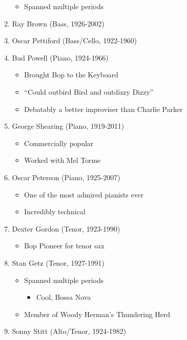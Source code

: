 \documentclass[]{article}
\providecommand{\tightlist}{%
  \setlength{\itemsep}{0pt}\setlength{\parskip}{0pt}}
\begin{document}
\begin{enumerate}
  \begin{itemize}
  \tightlist
  \item
    Spanned multiple periods
  \end{itemize}
\item
  Ray Brown (Bass, 1926-2002)
\item
  Oscar Pettiford (Bass/Cello, 1922-1960)
\item
  Bud Powell (Piano, 1924-1966)

  \begin{itemize}
  \tightlist
  \item
    Brought Bop to the Keyboard
  \item
    ``Could outbird Bird and outdizzy Dizzy''
  \item
    Debatably a better improviser than Charlie Parker
  \end{itemize}
\item
  George Shearing (Piano, 1919-2011)

  \begin{itemize}
  \tightlist
  \item
    Commercially popular
  \item
    Worked with Mel Torme
  \end{itemize}
\item
  Oscar Peterson (Piano, 1925-2007)

  \begin{itemize}
  \tightlist
  \item
    One of the most admired pianists ever
  \item
    Incredibly technical
  \end{itemize}
\item
  Dexter Gordon (Tenor, 1923-1990)

  \begin{itemize}
  \tightlist
  \item
    Bop Pioneer for tenor sax
  \end{itemize}
\item
  Stan Getz (Tenor, 1927-1991)

  \begin{itemize}
  \tightlist
  \item
    Spanned multiple periods

    \begin{itemize}
    \tightlist
    \item
      Cool, Bossa Nova
    \end{itemize}
  \item
    Member of Woody Herman's Thundering Herd
  \end{itemize}
\item
  Sonny Stitt (Alto/Tenor, 1924-1982)


\end{enumerate}
\end{document}

